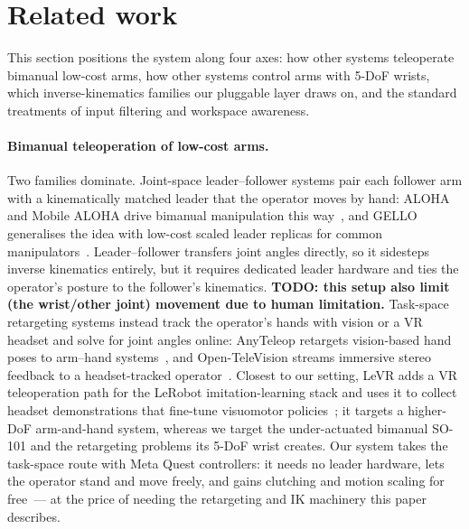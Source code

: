 \section{Related work}
\label{sec:related}

This section positions the system along four axes: how other systems
teleoperate bimanual low-cost arms, how other systems control arms with
5-DoF wrists, which inverse-kinematics families our pluggable layer
draws on, and the standard treatments of input filtering and workspace
awareness.

\paragraph{Bimanual teleoperation of low-cost arms.}
Two families dominate. Joint-space leader--follower systems pair each
follower arm with a kinematically matched leader that the operator moves
by hand: ALOHA and Mobile ALOHA drive bimanual manipulation this
way~\citep{zhao2023aloha,fu2024mobilealoha}, and GELLO generalises the
idea with low-cost scaled leader replicas for common
manipulators~\citep{wu2024gello}. Leader--follower transfers joint
angles directly, so it sidesteps inverse kinematics entirely, but it
requires dedicated leader hardware and ties the operator's posture to
the follower's kinematics. \textbf{TODO: this setup also limit (the wrist/other joint) movement due to human limitation.} Task-space retargeting systems instead track
the operator's hands with vision or a VR headset and solve for joint
angles online: AnyTeleop retargets vision-based hand poses to arm--hand
systems~\citep{qin2023anyteleop}, and Open-TeleVision streams immersive
stereo feedback to a headset-tracked operator~\citep{cheng2024televison}.
Closest to our setting, LeVR adds a VR teleoperation path for the LeRobot
imitation-learning stack and uses it to collect headset demonstrations
that fine-tune visuomotor policies~\citep{levr}; it targets a
higher-DoF arm-and-hand system, whereas we target the under-actuated
bimanual SO-101 and the retargeting problems its 5-DoF wrist creates.
Our system takes the task-space route with Meta Quest controllers: it
needs no leader hardware, lets the operator stand and move freely, and
gains clutching and motion scaling for free~--- at the price of needing
the retargeting and IK machinery this paper describes.


